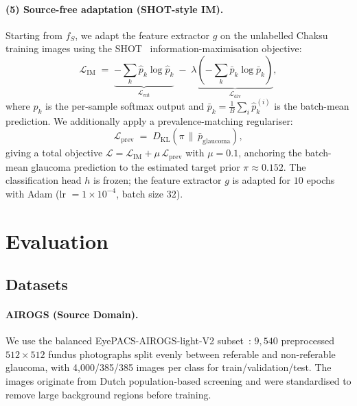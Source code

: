\documentclass[11pt]{article}
\newcommand{\src}{AIROGS}
\begin{document}
\paragraph{(5) Source-free adaptation (SHOT-style IM).}
\label{par:shot}
Starting from $f_S$, we adapt the feature extractor $g$ on the unlabelled
Chaksu training images using the SHOT~\cite{liang2020} information-maximisation
objective:
\begin{equation}
  \mathcal{L}_\mathrm{IM} \;=\;
    \underbrace{-\sum_k \hat{p}_k \log \hat{p}_k}_{\mathcal{L}_\mathrm{ent}}
    \;-\; \lambda \underbrace{\left(-\sum_k \bar{p}_k \log \bar{p}_k\right)}_{\mathcal{L}_\mathrm{div}},
  \label{eq:shot}
\end{equation}
where $\hat{p}_k$ is the per-sample softmax output and
$\bar{p}_k = \tfrac{1}{B}\sum_i \hat{p}_k^{(i)}$ is the batch-mean
prediction. We additionally apply a prevalence-matching regulariser:
\begin{equation}
  \mathcal{L}_\mathrm{prev} \;=\;
    D_\mathrm{KL}\!\left(\pi \,\big\|\, \bar{p}_\mathrm{glaucoma}\right),
  \label{eq:prev}
\end{equation}
giving a total objective $\mathcal{L} = \mathcal{L}_\mathrm{IM} +
\mu\,\mathcal{L}_\mathrm{prev}$ with $\mu = 0.1$, anchoring the
batch-mean glaucoma prediction to the estimated target prior
$\pi \approx 0.152$. The classification head $h$ is frozen; the feature
extractor $g$ is adapted for $10$ epochs with Adam
(lr $= 1\times10^{-4}$, batch size $32$).

\section{Evaluation}
\label{sec:eval}

\subsection{Datasets}

\paragraph{\src{} (Source Domain).}
We use the balanced EyePACS-AIROGS-light-V2 subset~\cite{devente2024}:
$9{,}540$ preprocessed $512\times512$ fundus photographs split evenly
between referable and non-referable glaucoma, with 4{,}000/385/385
images per class for train/validation/test. The images originate from
Dutch population-based screening and were standardised to remove large
background regions before training.
\end{document}
